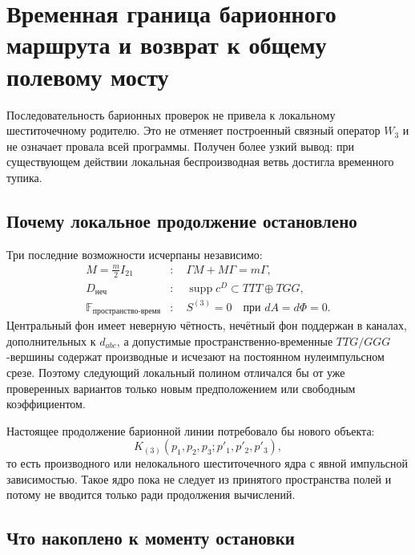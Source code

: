 \chapter{Временная граница барионного маршрута и возврат к общему полевому мосту}
\label{ch:v8-temporary-boundary-and-retrospective-return}

Последовательность барионных проверок не привела к локальному
шеститочечному родителю. Это не отменяет построенный связный оператор
$W_3$ и не означает провала всей программы. Получен более узкий вывод:
при существующем действии локальная беспроизводная ветвь достигла
временного тупика.

\section{Почему локальное продолжение остановлено}

Три последние возможности исчерпаны независимо:
\begin{equation}
 \begin{aligned}
 M=\frac m2I_{21}&:\quad \Gamma M+M\Gamma=m\Gamma,\\
 D_{\text{неч}}&:\quad
 \operatorname{supp}c^D\subset TTT\oplus TGG,\\
 \mathbb F_{\text{пространство-время}}&:\quad
 S^{(3)}=0\quad\text{при }dA=d\Phi=0.
 \end{aligned}
 \label{eq:v8-temporary-boundary-three-local-obstructions}
\end{equation}
Центральный фон имеет неверную чётность, нечётный фон поддержан в каналах,
дополнительных к $d_{abc}$, а допустимые пространственно-временные
$TTG/GGG$-вершины содержат производные и исчезают на постоянном
нулеимпульсном срезе. Поэтому следующий локальный полином отличался бы от
уже проверенных вариантов только новым предположением или свободным
коэффициентом.

Настоящее продолжение барионной линии потребовало бы нового объекта:
\begin{equation}
 K_{(3)}(p_1,p_2,p_3;p'_1,p'_2,p'_3),
 \label{eq:v8-temporary-boundary-nonlocal-six-point-kernel}
\end{equation}
то есть производного или нелокального шеститочечного ядра с явной
импульсной зависимостью. Такое ядро пока не следует из принятого
пространства полей и потому не вводится только ради продолжения вычислений.

\section{Что накоплено к моменту остановки}

